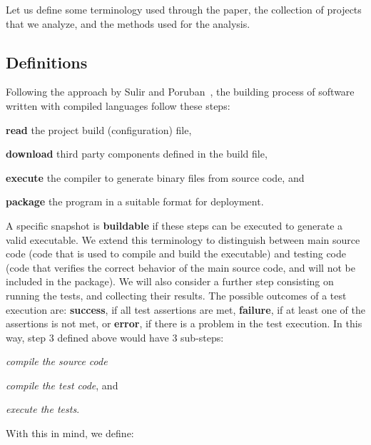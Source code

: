 
Let us define some terminology used through the paper, the collection of projects that we analyze, and the methods used for the analysis.

\subsection{Definitions}
\label{subsec:definitions}

Following the approach by Sulir and Poruban~\cite{Sulir:2016:QSJ:3001878.3001882}, the building process of software written with compiled languages follow these steps: 
\begin{inparaenum}[\bf(1)]
    \item \textbf{read} the project build (configuration) file,
    \item \textbf{download} third party components defined in the build file,
    \item \textbf{execute} the compiler to generate binary files from source code, and
    \item \textbf{package} the program in a suitable format for deployment.
\end{inparaenum}

A specific snapshot is {\bf buildable} if these steps can be executed to generate a valid executable. We extend this terminology to distinguish between main source code (code that is used to compile and build the executable) and testing code (code that verifies the correct behavior of the main source code, and will not be included in the package). We will also consider a further step consisting on running the tests, and collecting their results. 
The possible outcomes of a test execution are: \textbf{success}, if all test assertions are met, \textbf{failure}, if at least one of the assertions is not met, or \textbf{error}, if there is a problem in the test execution.
In this way, step 3 defined above would have 3 sub-steps:
\begin{inparaenum}[\bf(3.1)]
    \item \textit{compile the source code}
    \item \textit{compile the test code}, and
    \item \textit{execute the tests}.
\end{inparaenum}
With this in mind, we define:

